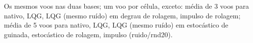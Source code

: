 Os mesmos voos nas duas bases; um voo por célula, exceto: média de 3 voos para nativo, LQG, LQG (mesmo ruído) em degrau de rolagem, impulso de rolagem; média de 5 voos para nativo, LQG, LQG (mesmo ruído) em estocástico de guinada, estocástico de rolagem, impulso (ruido/rnd20).
